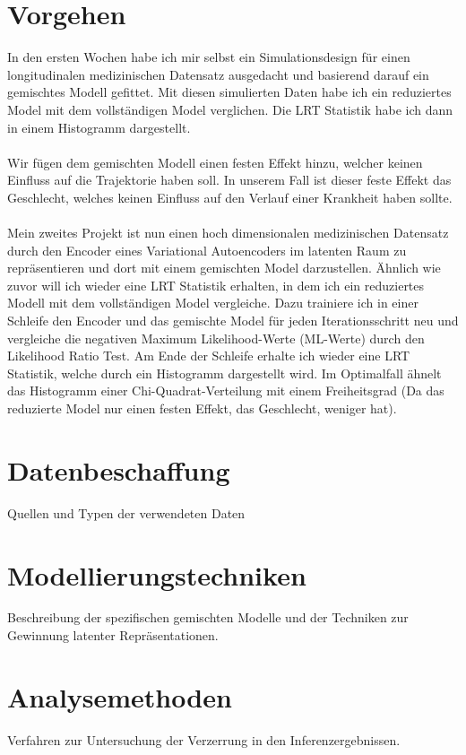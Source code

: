 \documentclass[%
thesis=student,%
coverpage=false,%
titlepage=false,%
headmarks=true, %
german,%
font=libertine, %
math=newpxtx, %
BCOR=5mm,%
coverBCOR=11mm%
]{tumbook}
\theoremstyle{break}
\begin{document}
\section{Vorgehen}
In den ersten Wochen habe ich mir selbst ein Simulationsdesign für einen longitudinalen medizinischen Datensatz ausgedacht und basierend darauf ein gemischtes Modell gefittet. Mit diesen simulierten Daten habe ich ein reduziertes Model mit dem vollständigen Model verglichen. Die LRT Statistik habe ich dann in einem Histogramm dargestellt.\\
\\
Wir fügen dem gemischten Modell einen festen Effekt hinzu, welcher keinen Einfluss auf die Trajektorie haben soll. In unserem Fall ist dieser feste Effekt das Geschlecht, welches keinen Einfluss auf den Verlauf einer Krankheit haben sollte.\\
\\
Mein zweites Projekt ist nun einen hoch dimensionalen medizinischen Datensatz durch den Encoder eines Variational Autoencoders im latenten Raum zu repräsentieren und dort mit einem gemischten Model darzustellen. Ähnlich wie zuvor will ich wieder eine LRT Statistik erhalten, in dem ich ein reduziertes Modell mit dem vollständigen Model vergleiche. Dazu trainiere ich in einer Schleife den Encoder und das gemischte Model für jeden Iterationsschritt neu und vergleiche die negativen Maximum Likelihood-Werte (ML-Werte) durch den Likelihood Ratio Test. Am Ende der Schleife erhalte ich wieder eine LRT Statistik, welche durch ein Histogramm dargestellt wird. Im Optimalfall ähnelt das Histogramm einer Chi-Quadrat-Verteilung mit einem Freiheitsgrad (Da das reduzierte Model nur einen festen Effekt, das Geschlecht, weniger hat).\\
\section{Datenbeschaffung}
Quellen und Typen der verwendeten Daten
\section{Modellierungstechniken}
Beschreibung der spezifischen gemischten Modelle und der Techniken zur Gewinnung latenter Repräsentationen.
\section{Analysemethoden}
Verfahren zur Untersuchung der Verzerrung in den Inferenzergebnissen.
\end{document}
